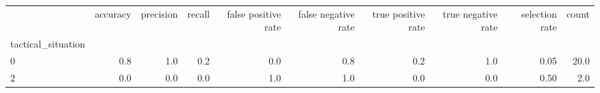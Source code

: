\begin{tabular}{lrrrrrrrrr}
\toprule
{} &  accuracy &  precision &  recall &  false positive rate &  false negative rate &  true positive rate &  true negative rate &  selection rate &  count \\
tactical\_situation &           &            &         &                      &                      &                     &                     &                 &        \\
\midrule
0                  &       0.8 &        1.0 &     0.2 &                  0.0 &                  0.8 &                 0.2 &                 1.0 &            0.05 &   20.0 \\
2                  &       0.0 &        0.0 &     0.0 &                  1.0 &                  1.0 &                 0.0 &                 0.0 &            0.50 &    2.0 \\
\bottomrule
\end{tabular}
